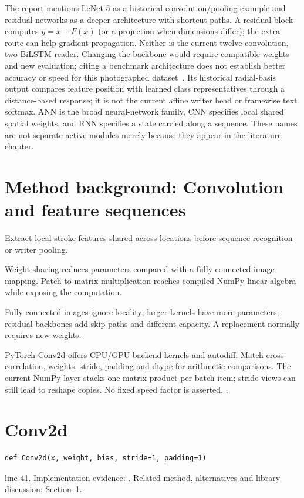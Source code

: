 The report mentions LeNet-5 as a historical convolution/pooling example and
residual networks as a deeper architecture with shortcut paths. A residual
block computes $y=x+F(x)$ (or a projection when dimensions differ); the extra
route can help gradient propagation. Neither is the current twelve-convolution,
two-BiLSTM reader. Changing the backbone would require compatible weights and
new evaluation; citing a benchmark architecture does not establish better
accuracy or speed for this photographed dataset~\cite{lenet1998,resnet2016}.
Its historical radial-basis output compares feature position with learned
class representatives through a distance-based response; it is not the current
affine writer head or framewise text softmax. ANN is the broad neural-network
family, CNN specifies local shared spatial weights, and RNN specifies a state
carried along a sequence. These names are not separate active modules merely
because they appear in the literature chapter.


\section{Method background: Convolution and feature sequences}\label{method:conv}
Extract local stroke features shared across locations before sequence recognition or writer pooling.


Weight sharing reduces parameters compared with a fully connected image mapping. Patch-to-matrix multiplication reaches compiled NumPy linear algebra while exposing the computation.


Fully connected images ignore locality; larger kernels have more parameters; residual backbones add skip paths and different capacity. A replacement normally requires new weights.


PyTorch Conv2d offers CPU/GPU backend kernels and autodiff. Match cross-correlation, weights, stride, padding and dtype for arithmetic comparisons. The current NumPy layer stacks one matrix product per batch item; stride views can still lead to reshape copies. No fixed speed factor is asserted. \cite{shi2017,torchconv,numpystride,numpymatmul}.


\section{Conv2d}\label{fn:recognise:Conv2d}
\begin{lstlisting}[style=sig]
def Conv2d(x, weight, bias, stride=1, padding=1)
\end{lstlisting}
 line 41. Implementation evidence: \cite{code2026}. Related method, alternatives and library discussion: Section~\ref{method:conv}.


